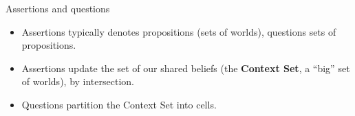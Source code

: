 \documentclass[10pt]{beamer}
\begin{document}
\begin{frame}{Assertions and questions}
	\begin{itemize}
		\item Assertions typically denotes propositions (sets of worlds), questions sets of propositions.
		\item Assertions update the set of our shared beliefs (the \textbf{Context Set}, a ``big'' set of worlds), by intersection.
		\item Questions partition the Context Set into cells.
	\end{itemize}
\end{frame}
\end{document}
